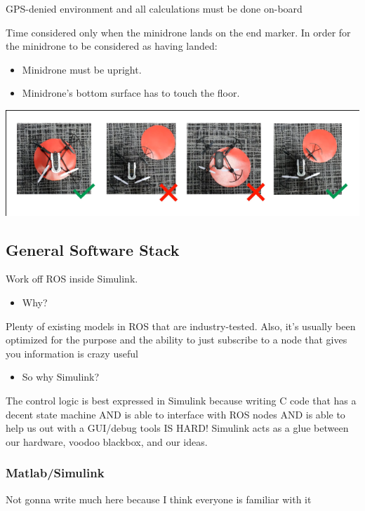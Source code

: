 \documentclass[unrestricted]{meetingnotesminutes}
\begin{document}
GPS-denied environment and all calculations must be done on-board

Time considered only when the minidrone lands on the end marker.
In order for the minidrone to be considered as having landed:
\begin{itemize}
\item Minidrone must be upright.
\item Minidrone's bottom surface has to touch the floor.
\end{itemize}
\begin{center}
\includegraphics[width=.9\linewidth]{./images/screenshot-01.png}
\end{center}

\subsection{General Software Stack}
\label{sec:org8c4f416}

Work off ROS inside Simulink.

\begin{itemize}
\item Why?
\end{itemize}
Plenty of existing models in ROS that are industry-tested. Also, it's usually been optimized for the purpose and the ability to just subscribe to a node that gives you information is crazy useful

\begin{itemize}
\item So why Simulink?
\end{itemize}
The control logic is best expressed in Simulink because writing C code that has a decent state machine AND is able to interface with ROS nodes AND is able to help us out with a GUI/debug tools IS HARD! Simulink acts as a glue between our hardware, voodoo blackbox, and our ideas.


\subsubsection{Matlab/Simulink}
\label{sec:org5e90514}
Not gonna write much here because I think everyone is familiar with it
\end{document}
